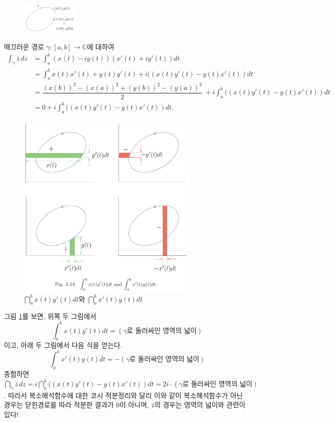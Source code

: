 \begin{figure}[!h]
\begin{center}
\includegraphics[width=0.25\textwidth]{./SaltChapter/fig-3-0-4}
\end{center}
\end{figure}

매끄러운 경로 $\gamma: [a,b] \to \mathbb C$에 대하여
\begin{align*}
\int_\gamma \bar z\, dz
&= \int_a^b (x(t)-iy(t))(x'(t)+iy'(t))dt \\
&= \int_a^b x(t)x'(t)+y(t)y'(t) + i((x(t)y'(t)-y(t)x'(t))dt \\
&= \dfrac{(x(b))^2-(x(a))^2 + (y(b))^2 - (y(a))^2}2\
+ i \int_a^b ((x(t)y'(t)-y(t)x'(t))dt \\
&= 0 + i \int_a^b ((x(t)y'(t)-y(t)x'(t))dt.
\end{align*}

\begin{figure}[!h]
\begin{center}
\includegraphics[width=0.8\textwidth]{./SaltChapter/fig-3-14}
\end{center}
\caption{$\dint_a^b x(t)y'(t)dt$와 $\dint_a^b x'(t)y(t)dt$
}
\label{fig-3-14}
\end{figure}

그림 \ref{fig-3-14}를 보면,  
위쪽 두 그림에서
\[
\int_a^b x(t)y'(t)dt = (\gamma\text{로 둘러싸인 영역의 넓이})
\]
이고, 아래 두 그림에서 다음 식을 얻는다.
\[
\int_a^b x'(t)y(t)dt = - (\gamma\text{로 둘러싸인 영역의 넓이})
\]
종합하면 $\dint_\gamma \bar z\, dz = i\dint_a^b ((x(t)y'(t)-y(t)x'(t))dt
= 2i\cdot (\gamma\text{로 둘러싸인 영역의 넓이})$.
따라서 복소해석함수에 대한 코시 적분정리와 달리
이와 같이 복소해석함수가 아닌 경우는 닫힌경로를 따라 적분한 결과가
$0$이 아니며, $\bar z$의 경우는 영역의 넓이와 관련이 있다!

